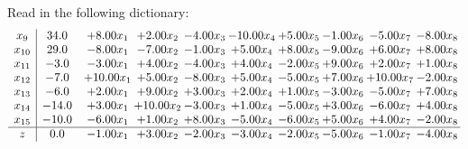 \documentclass[9pt]{article}
\begin{document}
Read in the following dictionary:
\[\begin{array}{c| c c@{\hskip 2pt} c@{\hskip 2pt} c@{\hskip 2pt} c@{\hskip 2pt} c@{\hskip 2pt} c@{\hskip 2pt} c@{\hskip 2pt} c@{\hskip 2pt} }
 x_{9}   &  34.0 & +  8.00 x_{1} & +  2.00 x_{2} & -4.00 x_{3} & -10.00 x_{4} & +  5.00 x_{5} & -1.00 x_{6} & -5.00 x_{7} & -8.00 x_{8}\\
 x_{10}   &  29.0 & -8.00 x_{1} & -7.00 x_{2} & -1.00 x_{3} & +  5.00 x_{4} & +  8.00 x_{5} & -9.00 x_{6} & +  6.00 x_{7} & +  8.00 x_{8}\\
 x_{11}   &  -3.0 & -3.00 x_{1} & +  4.00 x_{2} & -4.00 x_{3} & +  4.00 x_{4} & -2.00 x_{5} & +  9.00 x_{6} & +  2.00 x_{7} & +  1.00 x_{8}\\
 x_{12}   &  -7.0 & + 10.00 x_{1} & +  5.00 x_{2} & -8.00 x_{3} & +  5.00 x_{4} & -5.00 x_{5} & +  7.00 x_{6} & + 10.00 x_{7} & -2.00 x_{8}\\
 x_{13}   &  -6.0 & +  2.00 x_{1} & +  9.00 x_{2} & +  3.00 x_{3} & +  2.00 x_{4} & +  1.00 x_{5} & -3.00 x_{6} & -5.00 x_{7} & +  7.00 x_{8}\\
 x_{14}   &  -14.0 & +  3.00 x_{1} & + 10.00 x_{2} & -3.00 x_{3} & +  1.00 x_{4} & -5.00 x_{5} & +  3.00 x_{6} & -6.00 x_{7} & +  4.00 x_{8}\\
 x_{15}   &  -10.0 & -6.00 x_{1} & +  1.00 x_{2} & +  8.00 x_{3} & -5.00 x_{4} & -6.00 x_{5} & +  5.00 x_{6} & +  4.00 x_{7} & -2.00 x_{8}\\
\hline
z    &  0.0 & -1.00 x_{1} & +  3.00 x_{2} & -2.00 x_{3} & -3.00 x_{4} & -2.00 x_{5} & -5.00 x_{6} & -1.00 x_{7} & -4.00 x_{8}\\
\end{array}\]
\end{document}
